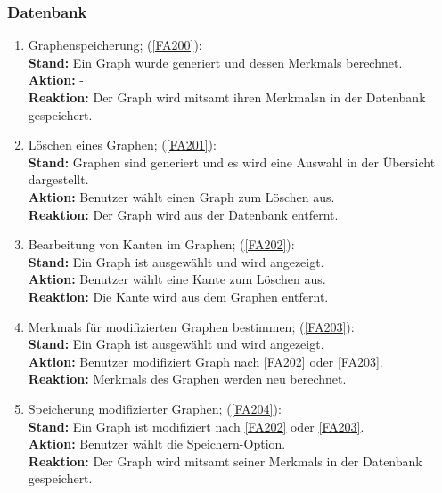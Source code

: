 \documentclass[13pt]{scrreprt}
\begin{document}
\subsubsection{Datenbank}
\begin{addmargin}[25pt]{0pt}
	\begin{enumerate} [label=T\arabic*,start=200]
		\item Graphenspeicherung; (\ref{FA200}):
		\\
		\textbf{Stand:} Ein Graph wurde generiert und dessen \Glspl{Merkmal} berechnet.
		\\
		\textbf{Aktion:} -
		\\
		\textbf{Reaktion:} Der Graph wird mitsamt ihren \Glspl{Merkmal}n in der Datenbank gespeichert.
		
		\item Löschen eines Graphen; (\ref{FA201}):
		\\
		\textbf{Stand:} Graphen sind generiert und es wird eine Auswahl in der Übersicht dargestellt.
		\\
		\textbf{Aktion:} Benutzer wählt einen Graph zum Löschen aus.
		\\
		\textbf{Reaktion:} Der Graph wird aus der Datenbank entfernt.
		
		\item Bearbeitung von Kanten im Graphen; (\ref{FA202}):
		\\
		\textbf{Stand:} Ein Graph ist ausgewählt und wird angezeigt.
		\\
		\textbf{Aktion:} Benutzer wählt eine Kante zum Löschen aus.
		\\
		\textbf{Reaktion:} Die Kante wird aus dem Graphen entfernt.
		
		\item \Glspl{Merkmal} für modifizierten Graphen bestimmen; (\ref{FA203}):
		\\
		\textbf{Stand:} Ein Graph ist ausgewählt und wird angezeigt.
		\\
		\textbf{Aktion:} Benutzer modifiziert Graph nach \ref{FA202} oder \ref{FA203}.
		\\
		\textbf{Reaktion:} \Glspl{Merkmal} des Graphen werden neu berechnet.
		
		\item Speicherung modifizierter Graphen; (\ref{FA204}):
		\\
		\textbf{Stand:} Ein Graph ist modifiziert nach \ref{FA202} oder \ref{FA203}.
		\\
		\textbf{Aktion:} Benutzer wählt die Speichern-Option.
		\\
		\textbf{Reaktion:} Der Graph wird mitsamt seiner \Glspl{Merkmal} in der Datenbank gespeichert.
	\end{enumerate}
\end{addmargin}
\end{document}
